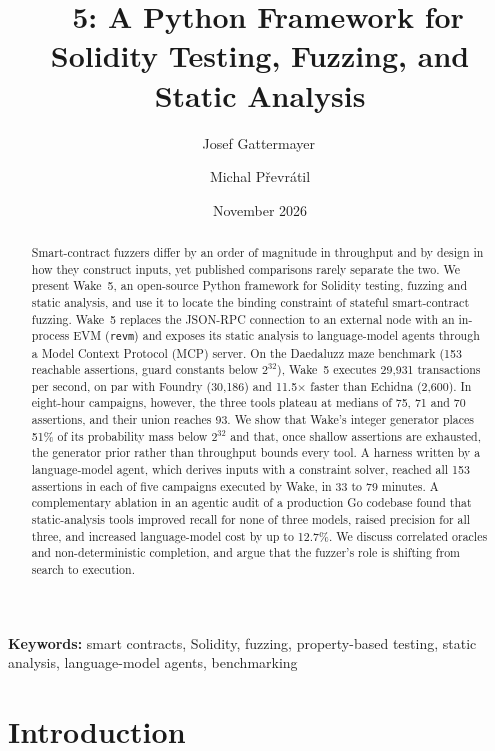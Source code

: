 \documentclass[11pt,a4paper]{article}
\title{\wake{}~5: A Python Framework for Solidity Testing, Fuzzing, and Static Analysis}
\author[1,2]{Josef Gattermayer\,\orcidlink{0009-0008-0293-4209}}
\author[1]{Michal P\v{r}evr\'{a}til}
\affil[1]{ack3 (ACK3 LTD), ack3.ai}
\affil[2]{Faculty of Information Technology, Czech Technical University in Prague}
\date{November 2026}
\newcommand{\wake}{Wake}
\newcommand{\revm}{\texttt{revm}}
\begin{document}
\maketitle

\begin{abstract}
Smart-contract fuzzers differ by an order of magnitude in throughput and by design in how they construct inputs, yet published comparisons rarely separate the two. We present \wake{}~5, an open-source Python framework for Solidity testing, fuzzing and static analysis, and use it to locate the binding constraint of stateful smart-contract fuzzing. \wake{}~5 replaces the JSON-RPC connection to an external node with an in-process EVM (\revm{}) and exposes its static analysis to language-model agents through a Model Context Protocol (MCP) server. On the Daedaluzz maze benchmark (153 reachable assertions, guard constants below $2^{32}$), \wake{}~5 executes 29{,}931 transactions per second, on par with Foundry (30{,}186) and 11.5$\times$ faster than Echidna (2{,}600). In eight-hour campaigns, however, the three tools plateau at medians of 75, 71 and 70 assertions, and their union reaches 93. We show that \wake{}'s integer generator places 51\% of its probability mass below $2^{32}$ and that, once shallow assertions are exhausted, the generator prior rather than throughput bounds every tool. A harness written by a language-model agent, which derives inputs with a constraint solver, reached all 153 assertions in each of five campaigns executed by \wake{}, in 33 to 79 minutes. A complementary ablation in an agentic audit of a production Go codebase found that static-analysis tools improved recall for none of three models, raised precision for all three, and increased language-model cost by up to 12.7\%. We discuss correlated oracles and non-deterministic completion, and argue that the fuzzer's role is shifting from search to execution.
\end{abstract}

\noindent\textbf{Keywords:} smart contracts, Solidity, fuzzing, property-based testing, static analysis, language-model agents, benchmarking

\section{Introduction}
\label{sec:intro}
\end{document}
